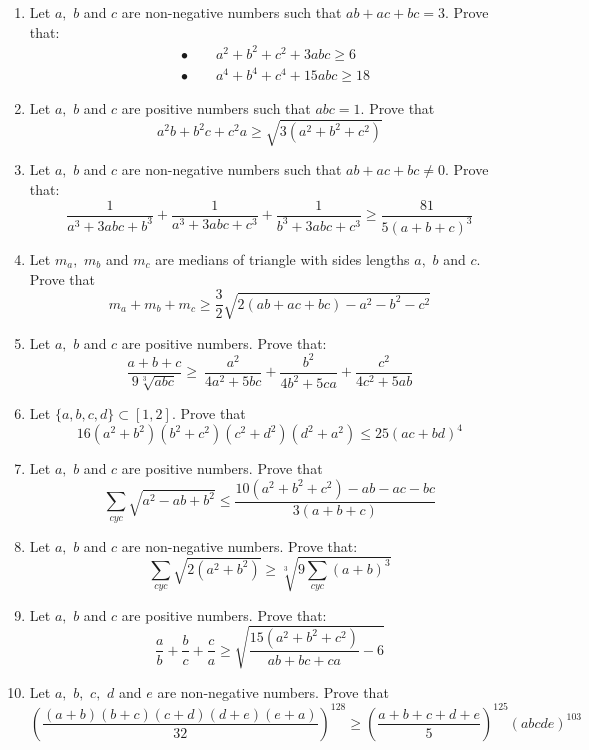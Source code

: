 \documentclass{article}
\begin{document}
\begin{enumerate}
\item  Let $ a,$ $ b$ and $ c$ are non-negative numbers such that $ ab + ac + bc = 3.$ Prove that:
\[\begin{aligned}& \bullet \qquad a^2 + b^2 + c^2 + 3abc\geq6\\& \bullet \qquad  a^4+b^4+c^4+15abc\geq18\end{aligned}\]

\item  Let $ a,$ $ b$ and $ c$ are positive numbers such that $ abc=1.$ Prove that
\[ a^2b+b^2c+c^2a\geq\sqrt{3(a^2+b^2+c^2)}\]

\item  Let $ a,$ $ b$ and $ c$ are non-negative numbers such that $ ab+ac+bc\neq0.$ Prove that:
\[ \frac {1}{a^3+3abc+b^3}+\frac {1}{a^3+3abc+c^3}+\frac {1}{b^3+3abc+c^3}\geq\frac {81}{5(a+b+c)^3}\]

\item  Let $ m_a,$ $ m_b$ and $ m_c$ are medians of triangle with sides lengths $ a,$ $ b$ and $ c.$ Prove that
\[ m_a + m_b + m_c\geq\frac  {3}{2}\sqrt {2(ab + ac + bc) - a^2 - b^2 - c^2}
\]

\item  Let $ a,$ $ b$ and $ c$ are positive numbers. Prove that:
\[ \frac  {a + b + c}{9\sqrt [3]{abc}} \geq\ \frac  {a^2}{4a^2 + 5bc} + \frac  {b^2}{4b^2 + 5ca} + \frac  {c^2}{4c^2 + 5ab}
\]

\item  Let $ \{a,b,c,d\}\subset[1,2].$ Prove that
\[ 16(a^2 + b^2)(b^2 + c^2)(c^2 + d^2)(d^2 + a^2)\leq25(ac + bd)^4
\]

\item  Let $ a,$ $ b$ and $ c$ are positive numbers. Prove that
\[ \sum_{cyc}\sqrt {a^2 - ab + b^2} \leq\frac  {10(a^2 + b^2 + c^2) - ab - ac - bc}{3(a + b + c)}
\]

\item  Let $ a,$ $ b$ and $ c$ are non-negative numbers. Prove that:
\[ \sum_{cyc}\sqrt{2(a^2+b^2)}\geq\sqrt[3]{9\sum_{cyc}(a+b)^3}\]

\item  Let $ a,$ $ b$ and $ c$ are positive numbers. Prove that:
\[ \frac  {a}{b} + \frac  {b}{c} + \frac  {c}{a}\ge \sqrt {\frac  {15(a^{2} + b^{2} + c^{2})}{ab + bc + ca} - 6}\]

\item  Let $ a,$ $ b,$ $ c,$ $ d$ and $ e$ are non-negative numbers. Prove that
\[ \left(\frac {(a+b)(b+c)(c+d)(d+e)(e+a)}{32}\right)^{128}\geq\left(\frac {a+b+c+d+e}{5}\right)^{125}(abcde)^{103}\]


\end{enumerate}
\end{document}
